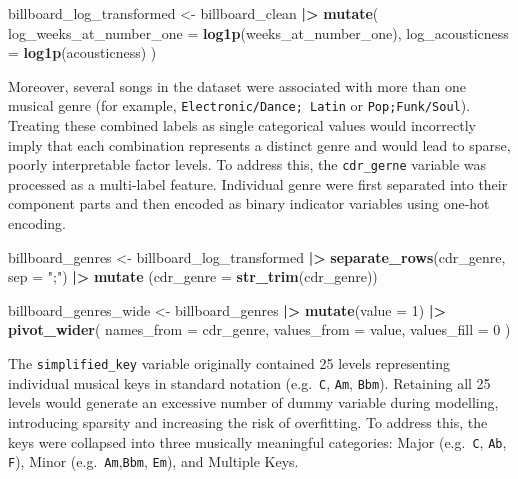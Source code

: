 \documentclass[
]{article}
\newenvironment{Shaded}{\begin{snugshade}}{\end{snugshade}}
\newcommand{\AttributeTok}[1]{\textcolor[rgb]{0.13,0.29,0.53}{#1}}
\newcommand{\DecValTok}[1]{\textcolor[rgb]{0.00,0.00,0.81}{#1}}
\newcommand{\FunctionTok}[1]{\textcolor[rgb]{0.13,0.29,0.53}{\textbf{#1}}}
\newcommand{\NormalTok}[1]{#1}
\newcommand{\OtherTok}[1]{\textcolor[rgb]{0.56,0.35,0.01}{#1}}
\newcommand{\SpecialCharTok}[1]{\textcolor[rgb]{0.81,0.36,0.00}{\textbf{#1}}}
\newcommand{\StringTok}[1]{\textcolor[rgb]{0.31,0.60,0.02}{#1}}
\begin{document}
\begin{Shaded}
\begin{Highlighting}[]
\NormalTok{billboard\_log\_transformed }\OtherTok{\textless{}{-}}\NormalTok{ billboard\_clean }\SpecialCharTok{|\textgreater{}} 
  \FunctionTok{mutate}\NormalTok{(}
    \AttributeTok{log\_weeks\_at\_number\_one =} \FunctionTok{log1p}\NormalTok{(weeks\_at\_number\_one),}
    \AttributeTok{log\_acousticness =} \FunctionTok{log1p}\NormalTok{(acousticness)}
\NormalTok{  )}
\end{Highlighting}
\end{Shaded}

Moreover, several songs in the dataset were associated with more than
one musical genre (for example, \texttt{Electronic/Dance;\ Latin} or
\texttt{Pop;Funk/Soul}). Treating these combined labels as single
categorical values would incorrectly imply that each combination
represents a distinct genre and would lead to sparse, poorly
interpretable factor levels. To address this, the \texttt{cdr\_gerne}
variable was processed as a multi-label feature. Individual genre were
first separated into their component parts and then encoded as binary
indicator variables using one-hot encoding.

\begin{Shaded}
\begin{Highlighting}[]
\NormalTok{billboard\_genres }\OtherTok{\textless{}{-}}\NormalTok{ billboard\_log\_transformed }\SpecialCharTok{|\textgreater{}} 
  \FunctionTok{separate\_rows}\NormalTok{(cdr\_genre, }\AttributeTok{sep =} \StringTok{";"}\NormalTok{) }\SpecialCharTok{|\textgreater{}} 
  \FunctionTok{mutate}\NormalTok{ (}\AttributeTok{cdr\_genre =} \FunctionTok{str\_trim}\NormalTok{(cdr\_genre))}

\NormalTok{billboard\_genres\_wide }\OtherTok{\textless{}{-}}\NormalTok{ billboard\_genres }\SpecialCharTok{|\textgreater{}} 
  \FunctionTok{mutate}\NormalTok{(}\AttributeTok{value =} \DecValTok{1}\NormalTok{) }\SpecialCharTok{|\textgreater{}} 
  \FunctionTok{pivot\_wider}\NormalTok{(}
    \AttributeTok{names\_from =}\NormalTok{ cdr\_genre, }
    \AttributeTok{values\_from =}\NormalTok{ value,}
    \AttributeTok{values\_fill =} \DecValTok{0}
\NormalTok{  )}
\end{Highlighting}
\end{Shaded}

The \texttt{simplified\_key} variable originally contained 25 levels
representing individual musical keys in standard notation
(e.g.~\texttt{C}, \texttt{Am}, \texttt{Bbm}). Retaining all 25 levels
would generate an excessive number of dummy variable during modelling,
introducing sparsity and increasing the risk of overfitting. To address
this, the keys were collapsed into three musically meaningful
categories: Major (e.g.~\texttt{C}, \texttt{Ab}, \texttt{F}), Minor
(e.g.~\texttt{Am},\texttt{Bbm}, \texttt{Em}), and Multiple Keys.
\end{document}
